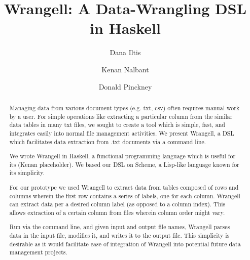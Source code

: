 \documentclass[preprint,nocopyrightspace]{sig-alternate}
\begin{document}
%

\title{Wrangell: A Data-Wrangling DSL in Haskell}

\author{Dana Iltis}
\author{Kenan Nalbant}
\author{Donald Pinckney}


\maketitle

\begin{abstract}
Managing data from various document types (e.g. txt, csv) often requires manual work by a user. For simple operations like extracting a particular column from the similar data tables in many txt files, we sought to create a tool which is simple, fast, and integrates easily into normal file management activities. We present Wrangell, a DSL which facilitates data extraction from .txt documents via a command line. 

We wrote Wrangell in Haskell, a functional programming language which is useful for its (Kenan placeholder). We based our DSL on Scheme, a Lisp-like language known for its  simplicity.

For our prototype we used Wrangell to extract data from tables composed of rows and columns wherein the first row contains a series of labels, one for each column. Wrangell can extract data per a desired column label (as opposed to a column index). This allows extraction of a certain column from files wherein column order might vary. 

Run via the command line, and given input and output file names, Wrangell parses data in the input file, modifies it, and writes it to the output file. This simplicity is desirable as it would facilitate ease of integration of Wrangell into potential future data management projects.    



\end{abstract}
\end{document}
